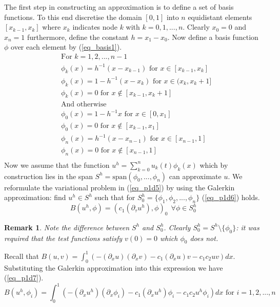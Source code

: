 \documentclass[11pt,fleqn]{article}
\theoremstyle{defstyle}
\newtheorem{rmrk}{Remark}[section]
\begin{document}
The first step in constructing an approximation is to define a set of basis functions. To this end discretise the domain $[0,1]$ into $n$ equidistant elements $[x_{k-1}, x_k]$ where $x_k$ indicates node $k$ with $k=0,1,...,n$. Clearly $x_0=0$ and $x_n=1$ furthermore, define the constant $h = x_1-x_0$. Now define a basis function $\phi$ over each element by (\ref{eq_basis1}).  
\begin{equation}
\begin{aligned}
&\text{For } k=1,2,...,n-1 \\
&\phi_k(x) = h^{-1}(x-x_{k-1}) \text{ for } x \in [x_{k-1}, x_k] \\
&\phi_k(x) = 1-h^{-1}(x-x_{k}) \text{ for } x \in (x_{k}, x_k+1] \\
&\phi_k(x) = 0 \text{ for } x \notin [x_{k-1}, x_k+1] \\
&\text{And otherwise} \\
&\phi_0(x) = 1- h^{-1}x \text{ for } x \in [0, x_1] \\
&\phi_0(x) = 0 \text{ for } x \notin [x_{k-1}, x_1] \\
&\phi_n(x) = h^{-1}(x-x_{n-1}) \text{ for } x \in [x_{n-1}, 1] \\
&\phi_n(x) = 0 \text{ for } x \notin [x_{n-1}, 1] \\
\end{aligned}
\label{eq_basis1}
\end{equation}
Now we assume that the function $u^h =\sum^n_{k=0} u_k(t) \phi_k(x)$ which by construction lies in the span $S^h=\text{span}(\phi_0,...,\phi_n)$ can approximate $u$. We reformulate the variational problem in (\ref{eq_p1d5}) by using the Galerkin approximation: find $u^h \in S^h$ such that for $S^h_0=\{\phi_1, \phi_2,...,\phi_n \}$ (\ref{eq_p1d6}) holds.
\begin{equation}
B(u^h, \phi) = (c_1(\partial_{\tau}u^h),\phi)_0~~\forall \phi \in S^h_0
\label{eq_p1d6}
\end{equation} 
\begin{rmrk}
Note the difference between $S^h$ and $S^h_0$. Clearly $S^h_0=S^h\setminus \{\phi_0\}$: it was required that the test functions satisfy $v(0)=0$ which $\phi_0$ does not. 
\end{rmrk}
Recall that $B(u, v) = \int_0^1 (-(\partial_xu)(\partial_xv) - c_1(\partial_xu)v - c_1c_2uv)dx$. Substituting the Galerkin approximation into this expression we have (\ref{eq_p1d7}).
\begin{equation}
B(u^h, \phi_i) = \int_0^1 (-(\partial_xu^h)(\partial_x\phi_i) - c_1(\partial_xu^h)\phi_i - c_1c_2u^h\phi_i)dx \text{ for } i=1,2,...,n
\label{eq_p1d7}
\end{equation}
\end{document}
